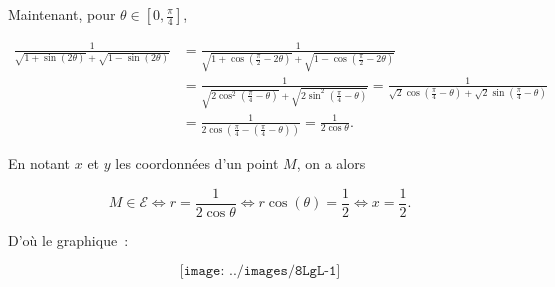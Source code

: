 {{Maintenant, pour $\theta\in[0,\frac{\pi}{4}]$,

\begin{align*}
\frac{1}{\sqrt{1+\sin(2\theta)}+\sqrt{1-\sin(2\theta)}}&=
\frac{1}{\sqrt{1+\cos(\frac{\pi}{2}-2\theta)}+\sqrt{1-\cos(\frac{\pi}{2}-2\theta)}}\\
 &=\frac{1}{\sqrt{2\cos^2(\frac{\pi}{4}-\theta)}+\sqrt{2\sin^2(\frac{\pi}{4}-\theta)}}
 =\frac{1}{\sqrt{2}\cos(\frac{\pi}{4}-\theta)+\sqrt{2}\sin(\frac{\pi}{4}-\theta)}\\
 &=\frac{1}{2\cos(\frac{\pi}{4}-(\frac{\pi}{4}-\theta))}=\frac{1}{2\cos\theta}.
\end{align*}

En notant $x$ et $y$ les coordonnées d'un point $M$, on a alors 

$$M\in\mathcal{E}\Leftrightarrow r=\frac{1}{2\cos\theta}\Leftrightarrow r\cos(\theta)=\frac{1}{2}\Leftrightarrow x=\frac{1}{2}.$$

D'où le graphique~:

$$\texttt{[image: ../images/8LgL-1]}$$
}
}
